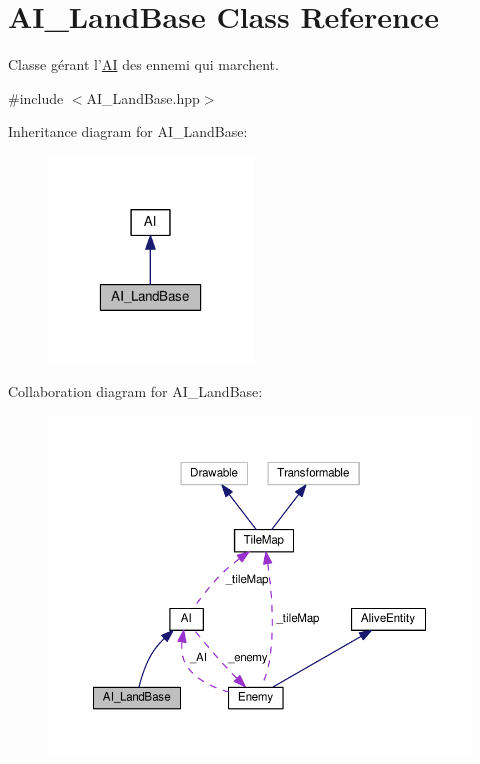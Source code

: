 \hypertarget{class_a_i___land_base}{\section{A\+I\+\_\+\+Land\+Base Class Reference}
\label{class_a_i___land_base}
}


Classe gérant l'\hyperlink{class_a_i}{A\+I} des ennemi qui marchent.  




{\ttfamily \#include $<$A\+I\+\_\+\+Land\+Base.\+hpp$>$}



Inheritance diagram for A\+I\+\_\+\+Land\+Base\+:
\nopagebreak
\begin{figure}[H]
\begin{center}
\leavevmode
\includegraphics[width=154pt]{class_a_i___land_base__inherit__graph}
\end{center}
\end{figure}


Collaboration diagram for A\+I\+\_\+\+Land\+Base\+:
\nopagebreak
\begin{figure}[H]
\begin{center}
\leavevmode
\includegraphics[width=350pt]{class_a_i___land_base__coll__graph}
\end{center}
\end{figure}
